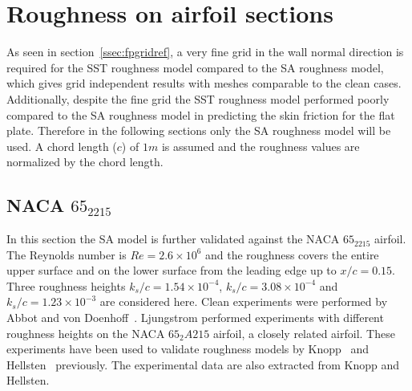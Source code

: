 \section{Roughness on airfoil sections}\label{sec:airfoilappln}
As seen in section~\ref{ssec:fpgridref}, a very fine grid in the wall normal direction is required for the SST roughness model compared to the SA roughness model, which gives grid independent results with meshes comparable to the clean cases. Additionally, despite the fine grid the SST roughness model performed poorly compared to the SA roughness model in predicting the skin friction for the flat plate. Therefore in the following sections only the SA roughness model will be used. A chord length ($c$) of $1 m$ is assumed and the roughness values are normalized by the chord length.
\subsection{NACA $65_2215$}
In this section the SA model is further validated against the NACA $65_2215$ airfoil. The Reynolds number is $Re=2.6\times10^6$ and the roughness covers the entire upper surface and on the lower surface from the leading edge up to $x/c=0.15$. Three roughness heights $k_s/c=1.54\times 10^{-4}$, $k_s/c=3.08\times 10^{-4}$ and $k_s/c=1.23\times 10^{-3}$ are considered here. Clean experiments were performed by Abbot and von Doenhoff~\cite{abbott2012theory}. Ljungstrom performed experiments with different roughness heights on the NACA $65_2A215$ airfoil, a closely related airfoil. These experiments have been used to validate roughness models by Knopp~\cite{knopp2009new} and Hellsten~\cite{hellsten1997extension} previously. The experimental data are also extracted from Knopp and Hellsten.
